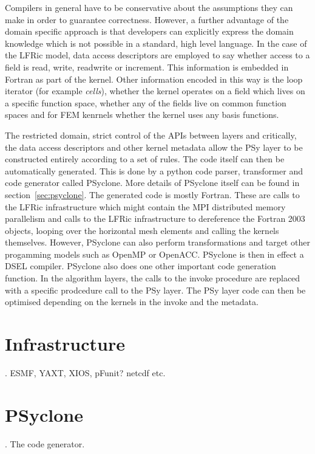 \documentclass[times]{elsarticle}
\begin{document}
Compilers in general have to be conservative about the assumptions
they can make in order to guarantee correctness. However, a further
advantage of the domain specific approach is that developers can
explicitly express the domain knowledge which is not possible in a
standard, high level language. In the case of the LFRic model, data
access descriptors are employed to say whether access to a field is
read, write, readwrite or increment. This information is embedded in
Fortran as part of the kernel. Other information encoded in this way
is the loop iterator (for example {\em cells}), whether the kernel
operates on a field which lives on a specific function space, whether
any of the fields live on common function spaces and for FEM kenrnels
whether the kernel uses any basis functions. 

The restricted domain, strict control of the APIs between layers and
critically, the data access descriptors and other kernel metadata
allow the PSy layer to be constructed entirely according to a set of
rules. The code itself can then be automatically generated. This is
done by a python code parser, transformer and code generator called
PSyclone. More details of PSyclone itself can be found in
section~\ref{sec:psyclone}. The generated code is mostly Fortran.
These are calls to the LFRic infrastructure which might contain the MPI
distributed memory parallelism and calls to the LFRic infrastructure to dereference the Fortran 2003
objects, looping over the horizontal mesh elements and calling the
kernels themselves. However, PSyclone can also perform transformations
and target other progamming models such as OpenMP or OpenACC. PSyclone
is then in effect a DSEL compiler. PSyclone also does one other
important code generation function. In the algorithm layers, the calls
to the invoke procedure are replaced with a specific prodcedure call
to the PSy layer. The PSy layer code can then be optimised depending on
the kernels in the invoke and the metadata. 

\section{\label{sec:lib}Infrastructure}.
ESMF, YAXT, XIOS, pFunit? netcdf etc.

\section{\label{sec:psyclone}PSyclone}.
The code generator.
\end{document}
